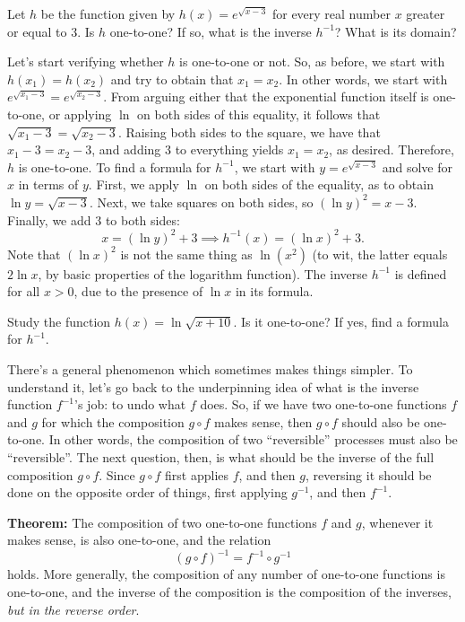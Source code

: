 \documentclass[nooutcomes]{ximera}
\begin{document}
\begin{example}
  Let $h$ be the function given by $h(x) = e^{\sqrt{x-3}}$ for every real number $x$ greater or equal to $3$. Is $h$ one-to-one? If so, what is the inverse $h^{-1}$? What is its domain?

  \begin{explanation}
    Let's start verifying whether $h$ is one-to-one or not. So, as before, we start with $h(x_1)=h(x_2)$ and try to obtain that $x_1=x_2$. In other words, we start with $e^{\sqrt{x_1-3}} = e^{\sqrt{x_2-3}}$. From arguing either that the exponential function itself is one-to-one, or applying $\ln$ on both sides of this equality, it follows that $\sqrt{x_1-3}=\sqrt{x_2-3}$. Raising both sides to the square, we have that $x_1-3=x_2-3$, and adding $3$ to everything yields $x_1=x_2$, as desired. Therefore, $h$ is one-to-one. To find a formula for $h^{-1}$, we start with $y= e^{\sqrt{x-3}}$ and solve for $x$ in terms of $y$. First, we apply $\ln$ on both sides of the equality, as to obtain $\ln y = \sqrt{x-3}$. Next, we take squares on both sides, so $(\ln y)^2 = x-3$. Finally, we add $3$ to both sides: $$x = (\ln y)^2+3 \implies h^{-1}(x) = (\ln x)^2+3.$$Note that $(\ln x)^2$ is not the same thing as $\ln(x^2)$ (to wit, the latter equals $2\ln x$, by basic properties of the logarithm function). The inverse $h^{-1}$ is defined for all $x>0$, due to the presence of $\ln x$ in its formula.
  \end{explanation}
\end{example}

\begin{exploration}
  Study the function $h(x) = \ln \sqrt{x+10}$. Is it one-to-one? If yes, find a formula for $h^{-1}$.
\end{exploration}

There's a general phenomenon which sometimes makes things simpler. To understand it, let's go back to the underpinning idea of what is the inverse function $f^{-1}$'s job: to undo what $f$ does. So, if we have two one-to-one functions $f$ and $g$ for which the composition $g\circ f$ makes sense, then $g\circ f$ should also be one-to-one. In other words, the composition of two ``reversible'' processes must also be ``reversible''. The next question, then, is what should be the inverse of the full composition $g\circ f$. Since $g\circ f$ first applies $f$, and then $g$, reversing it should be done on the opposite order of things, first applying $g^{-1}$, and then $f^{-1}$.

\begin{callout}
  {\bf Theorem:} The composition of two one-to-one functions $f$ and $g$, whenever it makes sense, is also one-to-one, and the relation $$(g\circ f)^{-1} = f^{-1}\circ g^{-1}$$ holds. More generally, the composition of any number of one-to-one functions is one-to-one, and the inverse of the composition is the composition of the inverses, \emph{but in the reverse order}.
\end{callout}
\end{document}
